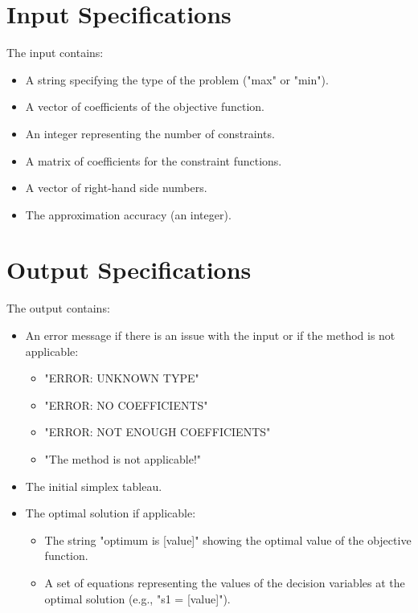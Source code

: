 \documentclass[12pt, legalpaper]{exam}
\begin{document}
\section*{Input Specifications}
The input contains:
\begin{itemize}
    \item A string specifying the type of the problem ("max" or "min").
    \item A vector of coefficients of the objective function.
    \item An integer representing the number of constraints.
    \item A matrix of coefficients for the constraint functions.
    \item A vector of right-hand side numbers.
    \item The approximation accuracy (an integer).
\end{itemize}

\section*{Output Specifications}
The output contains:
\begin{itemize}
    \item An error message if there is an issue with the input or if the method is not applicable:
        \begin{itemize}
            \item "ERROR: UNKNOWN TYPE"
            \item "ERROR: NO COEFFICIENTS"
            \item "ERROR: NOT ENOUGH COEFFICIENTS"
            \item "The method is not applicable!"
        \end{itemize}
    \item The initial simplex tableau.
    \item The optimal solution if applicable:
        \begin{itemize}
            \item The string "optimum is [value]" showing the optimal value of the objective function.
            \item A set of equations representing the values of the decision variables at the optimal solution (e.g., "s1 = [value]").
        \end{itemize}
\end{itemize}

\noindent
{}
\end{document}
